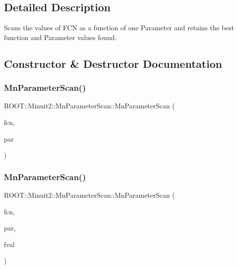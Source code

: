 \subsection{Detailed Description}
Scans the values of F\+CN as a function of one Parameter and retains the best function and Parameter values found. 

\subsection{Constructor \& Destructor Documentation}
\mbox{\label{classROOT_1_1Minuit2_1_1MnParameterScan_a74db5691c231aae4eb0291501a046ae4}} 
\subsubsection{\texorpdfstring{MnParameterScan()}{MnParameterScan()}\hspace{0.1cm}{\footnotesize\ttfamily [1/6]}}
{\footnotesize\ttfamily R\+O\+O\+T\+::\+Minuit2\+::\+Mn\+Parameter\+Scan\+::\+Mn\+Parameter\+Scan (\begin{DoxyParamCaption}\item[{const \mbox{\hyperlink{classROOT_1_1Minuit2_1_1FCNBase}{F\+C\+N\+Base}} \&}]{fcn,  }\item[{const \mbox{\hyperlink{classROOT_1_1Minuit2_1_1MnUserParameters}{Mn\+User\+Parameters}} \&}]{par }\end{DoxyParamCaption})}

\mbox{\label{classROOT_1_1Minuit2_1_1MnParameterScan_a741d7ce09e8fb56ab0f1345e8c8520c8}} 
\subsubsection{\texorpdfstring{MnParameterScan()}{MnParameterScan()}\hspace{0.1cm}{\footnotesize\ttfamily [2/6]}}
{\footnotesize\ttfamily R\+O\+O\+T\+::\+Minuit2\+::\+Mn\+Parameter\+Scan\+::\+Mn\+Parameter\+Scan (\begin{DoxyParamCaption}\item[{const \mbox{\hyperlink{classROOT_1_1Minuit2_1_1FCNBase}{F\+C\+N\+Base}} \&}]{fcn,  }\item[{const \mbox{\hyperlink{classROOT_1_1Minuit2_1_1MnUserParameters}{Mn\+User\+Parameters}} \&}]{par,  }\item[{double}]{fval }\end{DoxyParamCaption})}

